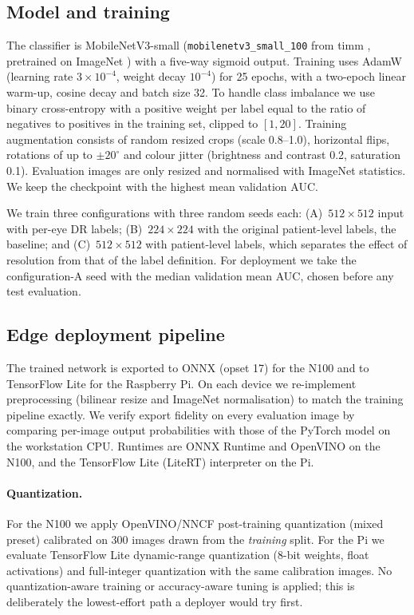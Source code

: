 \documentclass[a4paper,fleqn]{cas-sc}
\begin{document}
\subsection{Model and training}
The classifier is MobileNetV3-small \cite{howard2019searching}
(\texttt{mobilenetv3\_small\_100} from timm \cite{wightman2019pytorch},
pretrained on ImageNet \cite{deng2009imagenet}) with a five-way sigmoid
output. Training uses AdamW (learning rate $3\times10^{-4}$, weight decay
$10^{-4}$) for 25 epochs, with a two-epoch linear warm-up, cosine decay and
batch size 32. To handle class imbalance we use binary cross-entropy with
a positive weight per label equal to the ratio of negatives to positives in
the training set, clipped to $[1,20]$. Training augmentation consists of
random resized crops (scale 0.8--1.0), horizontal flips, rotations of up to
$\pm 20^\circ$ and colour jitter (brightness and contrast 0.2, saturation
0.1). Evaluation images are only resized and normalised with ImageNet
statistics. We keep the checkpoint with the highest mean validation AUC.

We train three configurations with three random seeds each:
(A)~$512\times512$ input with per-eye DR labels; (B)~$224\times224$ with
the original patient-level labels, the baseline; and (C)~$512\times512$
with patient-level labels, which separates the effect of resolution from
that of the label definition. For deployment we take the configuration-A
seed with the median validation mean AUC, chosen before any test
evaluation.

\subsection{Edge deployment pipeline}
The trained network is exported to ONNX (opset 17) for the N100 and to
TensorFlow Lite for the Raspberry Pi. On each device we re-implement
preprocessing (bilinear resize and ImageNet normalisation) to match the
training pipeline exactly. We verify export fidelity on every evaluation
image by comparing per-image output probabilities with those of the
PyTorch model on the workstation CPU. Runtimes are ONNX Runtime
\cite{onnxruntime} and OpenVINO \cite{openvino} on the N100, and the
TensorFlow Lite (LiteRT) interpreter \cite{litert} on the Pi.

\paragraph{Quantization.} For the N100 we apply OpenVINO/NNCF
\cite{kozlov2021nncf} post-training quantization (mixed preset) calibrated on 300 images drawn
from the \emph{training} split. For the Pi we evaluate TensorFlow Lite
dynamic-range quantization (8-bit weights, float activations) and
full-integer quantization with the same calibration images. No
quantization-aware training or accuracy-aware tuning is applied; this is
deliberately the lowest-effort path a deployer would try first.
\end{document}
